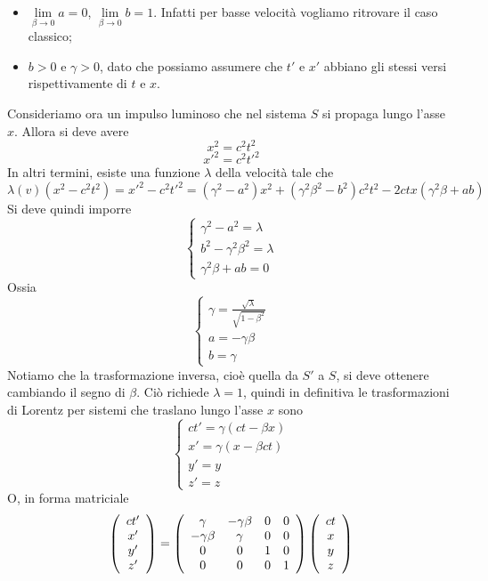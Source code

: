 \documentclass[a4paper,11pt]{book}
\theoremstyle{theorem}
\theoremstyle{definition}
\begin{document}
\begin{itemize}
	\item $\lim\limits_{\beta\to0}a=0$, $\lim\limits_{\beta\to0}b=1$. Infatti per basse velocità vogliamo ritrovare il caso classico;
	\item $b>0$ e $\gamma>0$, dato che possiamo assumere che $t'$ e $x'$ abbiano gli stessi versi rispettivamente di $t$ e $x$.
\end{itemize}
Consideriamo ora un impulso luminoso che nel sistema $S$ si propaga lungo l'asse $x$. Allora si deve avere
\[x^2=c^2t^2\]
\[x'^2=c^2t'^2\]
In altri termini, esiste una funzione $\lambda$ della velocità tale che
\[\lambda(v)(x^2-c^2t^2)=x'^2-c^2t'^2=(\gamma^2-a^2)x^2+(\gamma^2\beta^2-b^2)c^2t^2-2ctx(\gamma^2\beta+ab)\]
Si deve quindi imporre
\[\begin{cases}
\gamma^2-a^2=\lambda\\b^2-\gamma^2\beta^2=\lambda\\\gamma^2\beta+ab=0
\end{cases}\]
Ossia
\[\begin{cases}
\gamma=\frac{\sqrt{\lambda}}{\sqrt{1-\beta^2}}\\
a=-\gamma\beta\\
b=\gamma\end{cases}\]
Notiamo che la trasformazione inversa, cioè quella da $S'$ a $S$, si deve ottenere cambiando il segno di $\beta$. Ciò richiede $\lambda=1$, quindi in definitiva le trasformazioni di Lorentz per sistemi che traslano lungo l'asse $x$ sono
\[\begin{cases}
ct'=\gamma(ct-\beta x)\\
x'=\gamma(x-\beta ct)\\
y'=y\\
z'=z
\end{cases}\]
O, in forma matriciale
\[\left(\begin{array}{c}
ct'\\x'\\y'\\z'
\end{array}\right)=\left(\begin{array}{c c c c}
\gamma&-\gamma\beta&0&0\\-\gamma\beta&\gamma&0&0\\0&0&1&0\\0&0&0&1
\end{array}\right)\left(\begin{array}{c}
ct\\x\\y\\z
\end{array}\right)\]
\end{document}
